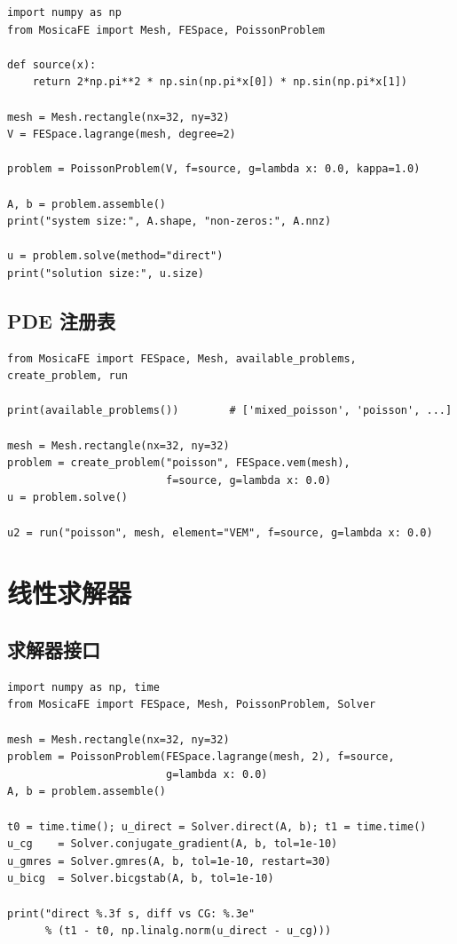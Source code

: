 \documentclass[UTF8,11pt,oneside]{ctexbook}
\theoremstyle{definition}
\theoremstyle{plain}
\newcommand{\code}[1]{\texttt{#1}}
\begin{document}
\begin{lstlisting}[language=MosicaFE,caption={示例 6.3：组装与求解}]
import numpy as np
from MosicaFE import Mesh, FESpace, PoissonProblem

def source(x):
    return 2*np.pi**2 * np.sin(np.pi*x[0]) * np.sin(np.pi*x[1])

mesh = Mesh.rectangle(nx=32, ny=32)
V = FESpace.lagrange(mesh, degree=2)

problem = PoissonProblem(V, f=source, g=lambda x: 0.0, kappa=1.0)

A, b = problem.assemble()
print("system size:", A.shape, "non-zeros:", A.nnz)

u = problem.solve(method="direct")
print("solution size:", u.size)
\end{lstlisting}

\section{PDE 注册表}

\begin{lstlisting}[language=MosicaFE,caption={示例 6.4：按名字创建与求解方程}]
from MosicaFE import FESpace, Mesh, available_problems, create_problem, run

print(available_problems())        # ['mixed_poisson', 'poisson', ...]

mesh = Mesh.rectangle(nx=32, ny=32)
problem = create_problem("poisson", FESpace.vem(mesh),
                         f=source, g=lambda x: 0.0)
u = problem.solve()

u2 = run("poisson", mesh, element="VEM", f=source, g=lambda x: 0.0)
\end{lstlisting}

\chapter{线性求解器}
\label{chap:solvers}

\section{求解器接口}

\begin{lstlisting}[language=MosicaFE,caption={示例 7.1：\code{Solver} 接口}]
import numpy as np, time
from MosicaFE import FESpace, Mesh, PoissonProblem, Solver

mesh = Mesh.rectangle(nx=32, ny=32)
problem = PoissonProblem(FESpace.lagrange(mesh, 2), f=source,
                         g=lambda x: 0.0)
A, b = problem.assemble()

t0 = time.time(); u_direct = Solver.direct(A, b); t1 = time.time()
u_cg    = Solver.conjugate_gradient(A, b, tol=1e-10)
u_gmres = Solver.gmres(A, b, tol=1e-10, restart=30)
u_bicg  = Solver.bicgstab(A, b, tol=1e-10)

print("direct %.3f s, diff vs CG: %.3e"
      % (t1 - t0, np.linalg.norm(u_direct - u_cg)))
\end{lstlisting}
\end{document}
